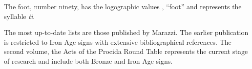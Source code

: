 The foot, number ninety, has the logographic values \PES, \enquote{foot} and represents the syllable \textit{ti}.

The most up-to-date lists are those published by Marazzi. The earlier publication is restricted to Iron Age signs with extensive bibliographical references. The second volume, the Acts of the Procida Round Table represents the current stage of research and include both Bronze and Iron Age signs.


\def\ego{\bgroup\anatolian\char"14400\egroup}
\def\egoi{\bgroup\anatolian\char"14401\egroup}
\def\egoii{\bgroup\anatolian\char"14402\egroup}
\def\monsii{\bgroup\anatolian\char"14403\egroup}
\def\egoiv{\bgroup\anatolian\char"14404\egroup}

\def\piscis{\bgroup\anatolian\char"144A5\egroup}

\def\ansign#1{
\bgroup
\anatolian\scalebox{2.5}{\char #1}
\egroup
}

